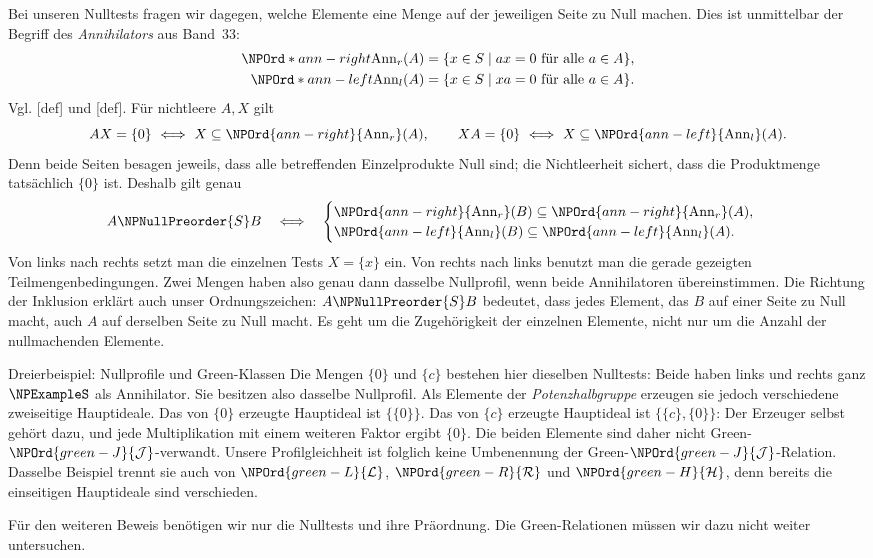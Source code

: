 Bei unseren Nulltests fragen wir dagegen, welche Elemente eine Menge
auf der jeweiligen Seite zu Null machen. Dies ist unmittelbar der
Begriff des \emph{Annihilators} aus Band~33:
\[
 \begin{aligned}
 \NPOrd*{ann-right}{\operatorname{Ann}_r}(A)&=\{x\in S\mid ax=0\text{ für alle }a\in A\},\\
 \NPOrd*{ann-left}{\operatorname{Ann}_l}(A)&=\{x\in S\mid xa=0\text{ für alle }a\in A\}.
 \end{aligned}
\]
Vgl. [def] und
[def].
Für nichtleere \(A,X\) gilt
\[
 AX=\{0\}\ \Longleftrightarrow\ X\subseteq\NPOrd{ann-right}{\operatorname{Ann}_r}(A),
 \qquad
 XA=\{0\}\ \Longleftrightarrow\ X\subseteq\NPOrd{ann-left}{\operatorname{Ann}_l}(A).
\]
Denn beide Seiten besagen jeweils, dass alle betreffenden
Einzelprodukte Null sind; die Nichtleerheit sichert, dass die
Produktmenge tatsächlich \(\{0\}\) ist. Deshalb gilt genau
\[
 A\NPNullPreorder{S} B\quad\Longleftrightarrow\quad
 \begin{cases}
 \NPOrd{ann-right}{\operatorname{Ann}_r}(B)\subseteq\NPOrd{ann-right}{\operatorname{Ann}_r}(A),\\
 \NPOrd{ann-left}{\operatorname{Ann}_l}(B)\subseteq\NPOrd{ann-left}{\operatorname{Ann}_l}(A).
 \end{cases}
\]
Von links nach rechts setzt man die einzelnen Tests \(X=\{x\}\)
ein. Von rechts nach links benutzt man die gerade gezeigten
Teilmengenbedingungen. Zwei Mengen haben also genau dann dasselbe
Nullprofil, wenn beide Annihilatoren übereinstimmen.
Die Richtung der Inklusion erklärt auch unser Ordnungszeichen:
\(A\NPNullPreorder{S} B\) bedeutet, dass jedes Element, das \(B\) auf einer
Seite zu Null macht, auch \(A\) auf derselben Seite zu Null macht.
Es geht um die Zugehörigkeit der einzelnen Elemente, nicht nur um
die Anzahl der nullmachenden Elemente.

\begin{NPReadingExample}{Dreierbeispiel: Nullprofile und Green-Klassen}
Die Mengen \(\{0\}\) und \(\{c\}\) bestehen hier dieselben Nulltests:
Beide haben links und rechts ganz \(\NPExampleS\) als Annihilator. Sie besitzen
also dasselbe Nullprofil. Als Elemente der \emph{Potenzhalbgruppe}
erzeugen sie jedoch verschiedene zweiseitige Hauptideale.
Das von \(\{0\}\) erzeugte Hauptideal ist \(\{\{0\}\}\).
Das von \(\{c\}\) erzeugte Hauptideal ist
\(\{\{c\},\{0\}\}\): Der Erzeuger selbst gehört dazu, und jede
Multiplikation mit einem weiteren Faktor ergibt \(\{0\}\).
Die beiden Elemente sind daher nicht Green-\(\NPOrd{green-J}{\mathcal J}\)-verwandt.
Unsere Profilgleichheit ist folglich keine Umbenennung der
Green-\(\NPOrd{green-J}{\mathcal J}\)-Relation. Dasselbe Beispiel trennt sie auch
von \(\NPOrd{green-L}{\mathcal L}\), \(\NPOrd{green-R}{\mathcal R}\) und \(\NPOrd{green-H}{\mathcal H}\), denn
bereits die einseitigen Hauptideale sind verschieden.
\end{NPReadingExample}
Für den weiteren Beweis benötigen wir nur die Nulltests und ihre
Präordnung. Die Green-Relationen müssen wir dazu nicht weiter untersuchen.

